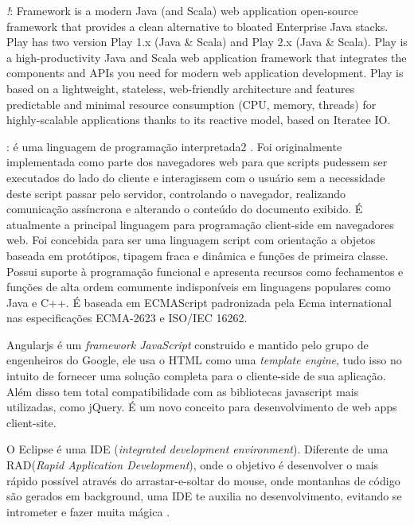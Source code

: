 \documentclass{abntpuc}
\begin{document}
	\textit{!}: Framework is a modern Java (and Scala) web application open-source framework that provides a clean alternative to bloated Enterprise Java stacks. Play has two version Play 1.x (Java & Scala) and Play 2.x (Java & Scala).
	Play is a high-productivity Java and Scala web application framework that integrates the components and APIs you need for modern web application development.
	Play is based on a lightweight, stateless, web-friendly architecture and features predictable and minimal resource consumption (CPU, memory, threads) for highly-scalable applications thanks to its reactive model, based on Iteratee IO.\cite{alterar}



	\textit{}: é uma linguagem de programação interpretada2 . Foi originalmente implementada como parte dos navegadores web para que scripts pudessem ser executados do lado do cliente e interagissem com o usuário sem a necessidade deste script passar pelo servidor, controlando o navegador, realizando comunicação assíncrona e alterando o conteúdo do documento exibido.
	É atualmente a principal linguagem para programação client-side em navegadores web. Foi concebida para ser uma linguagem script com orientação a objetos baseada em protótipos, tipagem fraca e dinâmica e funções de primeira classe. Possui suporte à programação funcional e apresenta recursos como fechamentos e funções de alta ordem comumente indisponíveis em linguagens populares como Java e C++.
	É baseada em ECMAScript padronizada pela Ecma international nas especificações ECMA-2623 e ISO/IEC 16262.\cite{alterar}

	Angularjs é um \textit{framework JavaScript} construido e mantido pelo grupo de engenheiros do Google, ele usa o HTML como uma \textit{template engine}, tudo isso no intuito de fornecer uma solução completa para o cliente-side de sua aplicação. Além disso tem total compatibilidade com as bibliotecas javascript mais utilizadas, como jQuery. É um novo conceito para desenvolvimento de web apps client-site.\cite{angularjs}


	O Eclipse é uma IDE (\textit{integrated development environment}). Diferente de uma RAD(\textit{Rapid Application Development}), onde o objetivo é desenvolver o mais rápido possível através do arrastar-e-soltar do mouse, onde montanhas de código são gerados em background, uma IDE te auxilia no desenvolvimento, evitando se intrometer e fazer muita mágica \cite{caelum}.\par
\end{document}
